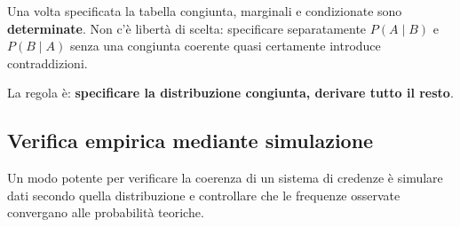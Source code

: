 \documentclass[
  italian,
  letterpaper,
  a4paper,
  11pt,
  open=any]{scrbook}
\theoremstyle{plain}
\theoremstyle{definition}
\theoremstyle{definition}
\theoremstyle{remark}
\begin{document}
\begin{tcolorbox}[enhanced jigsaw, arc=.35mm, bottomrule=.15mm, bottomtitle=1mm, breakable, colback=white, colbacktitle=quarto-callout-important-color!10!white, colframe=quarto-callout-important-color-frame, coltitle=black, left=2mm, leftrule=.75mm, opacityback=0, opacitybacktitle=0.6, rightrule=.15mm, title=\textcolor{quarto-callout-important-color}{\faExclamation}\hspace{0.5em}{Messaggio chiave}, titlerule=0mm, toprule=.15mm, toptitle=1mm]

Una volta specificata la tabella congiunta, marginali e condizionate
sono \textbf{determinate}. Non c'è libertà di scelta: specificare
separatamente \(P(A \mid B)\) e \(P(B \mid A)\) senza una congiunta
coerente quasi certamente introduce contraddizioni.

La regola è: \textbf{specificare la distribuzione congiunta, derivare
tutto il resto}.

\end{tcolorbox}

\subsection{Verifica empirica mediante
simulazione}\label{verifica-empirica-mediante-simulazione}

Un modo potente per verificare la coerenza di un sistema di credenze è
simulare dati secondo quella distribuzione e controllare che le
frequenze osservate convergano alle probabilità teoriche.
\end{document}
